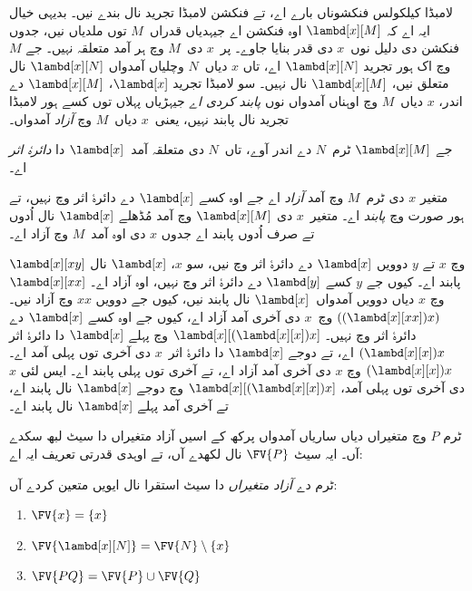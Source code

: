 \documentclass[../../../include/open-logic-section]{subfiles}
\begin{document}

لامبڈا کیلکولس فنکشوناں بارے اے، تے فنکشن لامبڈا تجرید نال
بندے نیں۔ بدیہی خیال ایہ اے کہ $\lambd[x][M]$ اوہ فنکشن اے
جیہدیاں قدراں~$M$ توں ملدیاں نیں، جدوں فنکشن دی دلیل
نوں~$x$ دی قدر بنایا جاوے۔ پر~$x$ دی~$M$ وچ ہر آمد متعلقہ
نہیں۔ جے $M$ وچ اک ہور تجرید $\lambd[x][N]$ اے، تاں $x$
دیاں~$N$ وچلیاں آمدواں $\lambd[x][N]$ نال متعلق نیں،
$\lambd[x][M]$ نال نہیں۔ سو لامبڈا تجرید $\lambd[x]$،
$\lambd[x][M]$ دے اندر، $x$ دیاں~$M$ وچ اوہناں آمدواں
نوں \emph{پابند کردی اے} جیہڑیاں پہلاں توں کسے ہور
لامبڈا تجرید نال پابند نہیں، یعنی~$x$ دیاں~$M$ وچ
\emph{آزاد} آمدواں۔

\begin{defn}
جے $\lambd[x][M]$ ٹرم~$N$ دے اندر آوے، تاں~$N$ دی متعلقہ
آمد~$\lambd[x]$ دا \emph{دائرۂ اثر} اے۔
\end{defn}

\begin{defn}
متغیر $x$ دی ٹرم~$M$ وچ آمد \emph{آزاد} اے جے اوہ کسے
$\lambd[x]$ دے دائرۂ اثر وچ نہیں، تے ہور صورت وچ \emph{پابند} اے۔
متغیر~$x$ دی $\lambd[x][M]$ وچ آمد مُڈھلے $\lambd[x]$ نال
اُدوں تے صرف اُدوں پابند اے جدوں $x$ دی اوہ آمد~$M$ وچ آزاد اے۔
\end{defn}

\begin{ex}
$\lambd[x][x y]$ وچ $x$ تے $y$ دوویں $\lambd[x]$ دے دائرۂ
اثر وچ نیں، سو $x$، $\lambd[x]$ نال پابند اے۔ کیوں جے $y$
کسے $\lambd[y]$ دے دائرۂ اثر وچ نہیں، اوہ آزاد اے۔
$\lambd[x][x x]$ وچ $x$ دیاں دوویں آمدواں~$\lambd[x]$ نال پابند
نیں، کیوں جے دوویں $xx$ وچ آزاد نیں۔ $((\lambd[x][xx])x)$ وچ~$x$
دی آخری آمد آزاد اے، کیوں جے اوہ کسے $\lambd[x]$ دے دائرۂ اثر وچ
نہیں۔ $\lambd[x][(\lambd[x][x])x]$ وچ پہلے $\lambd[x]$ دا دائرۂ
اثر $(\lambd[x][x])x$ اے، تے دوجے $\lambd[x]$ دا دائرۂ اثر~$x$
دی آخری توں پہلی آمد اے۔ $(\lambd[x][x])x$ وچ $x$ دی آخری آمد آزاد
اے، تے آخری توں پہلی پابند اے۔ ایس لئی $x$ دی آخری توں پہلی آمد،
$\lambd[x][(\lambd[x][x])x]$ وچ دوجے $\lambd[x]$ نال پابند اے،
تے آخری آمد پہلے $\lambd[x]$ نال پابند اے۔
\end{ex}

ٹرم $P$ وچ متغیراں دیاں ساریاں آمدواں پرکھ کے اسیں آزاد
متغیراں دا سیٹ لبھ سکدے آں۔ ایہ سیٹ $\FV{P}$ نال لکھدے آں، تے
اوہدی قدرتی تعریف ایہ اے:

\begin{defn} 
ٹرم دے \emph{آزاد متغیراں} دا سیٹ استقرا نال ایویں متعین کردے آں:
\begin{enumerate}
  \item $\FV{x} = \{x\}$ 
  \item $\FV{\lambd[x][N]} = \FV{N} \setminus \{x\}$ 
  \item $\FV{PQ} = \FV{P} \cup \FV{Q}$ 
\end{enumerate}
\end{defn}
\end{document}
